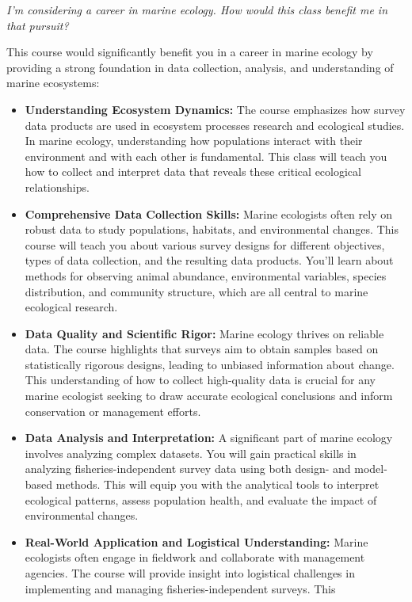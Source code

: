\documentclass[
  letterpaper,
  oneside,
  open=any]{scrbook}
\providecommand{\tightlist}{%
  \setlength{\itemsep}{0pt}\setlength{\parskip}{0pt}}\usepackage{longtable,booktabs,array}
\begin{document}
\emph{I'm considering a career in marine ecology. How would this class
benefit me in that pursuit?}

This course would significantly benefit you in a career in marine
ecology by providing a strong foundation in data collection, analysis,
and understanding of marine ecosystems:

\begin{itemize}
\tightlist
\item
  \textbf{Understanding Ecosystem Dynamics:} The course emphasizes how
  survey data products are used in ecosystem processes research and
  ecological studies. In marine ecology, understanding how populations
  interact with their environment and with each other is fundamental.
  This class will teach you how to collect and interpret data that
  reveals these critical ecological relationships.
\item
  \textbf{Comprehensive Data Collection Skills:} Marine ecologists often
  rely on robust data to study populations, habitats, and environmental
  changes. This course will teach you about various survey designs for
  different objectives, types of data collection, and the resulting data
  products. You'll learn about methods for observing animal abundance,
  environmental variables, species distribution, and community
  structure, which are all central to marine ecological research.
\item
  \textbf{Data Quality and Scientific Rigor:} Marine ecology thrives on
  reliable data. The course highlights that surveys aim to obtain
  samples based on statistically rigorous designs, leading to unbiased
  information about change. This understanding of how to collect
  high-quality data is crucial for any marine ecologist seeking to draw
  accurate ecological conclusions and inform conservation or management
  efforts.
\item
  \textbf{Data Analysis and Interpretation:} A significant part of
  marine ecology involves analyzing complex datasets. You will gain
  practical skills in analyzing fisheries-independent survey data using
  both design- and model-based methods. This will equip you with the
  analytical tools to interpret ecological patterns, assess population
  health, and evaluate the impact of environmental changes.
\item
  \textbf{Real-World Application and Logistical Understanding:} Marine
  ecologists often engage in fieldwork and collaborate with management
  agencies. The course will provide insight into logistical challenges
  in implementing and managing fisheries-independent surveys. This

\end{itemize}
\end{document}
